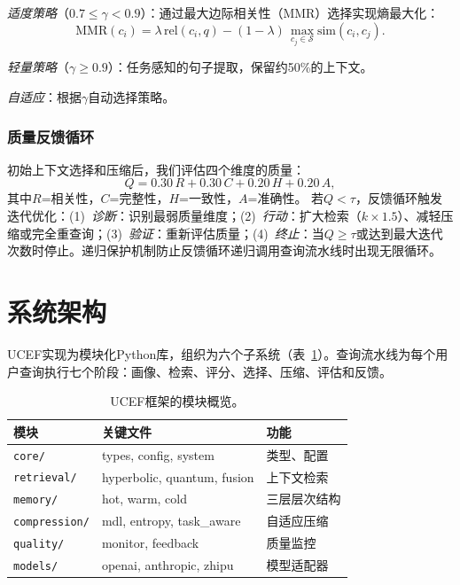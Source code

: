 \documentclass[journal]{IEEEtran}
\newcommand{\ucef}{\textsf{UCEF}}
\begin{document}
\emph{适度策略}（$0.7 \leq \gamma < 0.9$）：通过最大边际相关性（MMR）选择实现熵最大化：
\begin{equation}
  \mathrm{MMR}(c_i) =
    \lambda\, \mathrm{rel}(c_i, q)
    - (1-\lambda)\,
      \max_{c_j \in \mathcal{S}} \mathrm{sim}(c_i, c_j).
  \label{eq:mmr}
\end{equation}

\emph{轻量策略}（$\gamma \geq 0.9$）：任务感知的句子提取，保留约50\%的上下文。

\emph{自适应}：根据$\gamma$自动选择策略。

\subsubsection{质量反馈循环}
\label{sec:feedback}

初始上下文选择和压缩后，我们评估四个维度的质量：
\begin{equation}
  Q = 0.30\,R + 0.30\,C + 0.20\,H + 0.20\,A,
  \label{eq:quality}
\end{equation}
其中$R$=相关性，$C$=完整性，$H$=一致性，$A$=准确性。
若$Q < \tau$，反馈循环触发迭代优化：(1)~\emph{诊断}：识别最弱质量维度；(2)~\emph{行动}：扩大检索（$k \times 1.5$）、减轻压缩或完全重查询；(3)~\emph{验证}：重新评估质量；(4)~\emph{终止}：当$Q \geq \tau$或达到最大迭代次数时停止。递归保护机制防止反馈循环递归调用查询流水线时出现无限循环。


\section{系统架构}
\label{sec:architecture}

\ucef{}实现为模块化Python库，组织为六个子系统（表~\ref{tab:modules}）。查询流水线为每个用户查询执行七个阶段：画像、检索、评分、选择、压缩、评估和反馈。

\begin{table}[t]
\caption{\ucef{}框架的模块概览。}
\label{tab:modules}
\centering
\small
\begin{tabular}{@{}lll@{}}
\toprule
模块 & 关键文件 & 功能 \\
\midrule
\texttt{core/} & types, config, system & 类型、配置 \\
\texttt{retrieval/} & hyperbolic, quantum, fusion & 上下文检索 \\
\texttt{memory/} & hot, warm, cold & 三层层次结构 \\
\texttt{compression/} & mdl, entropy, task\_aware & 自适应压缩 \\
\texttt{quality/} & monitor, feedback & 质量监控 \\
\texttt{models/} & openai, anthropic, zhipu & 模型适配器 \\
\bottomrule
\end{tabular}
\end{table}
\end{document}
